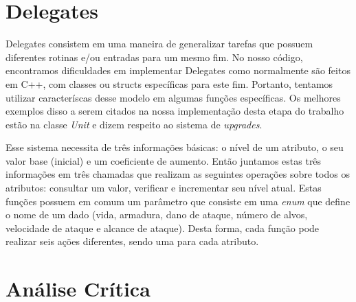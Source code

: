 \documentclass[rel_mlp]{iiufrgs}
\begin{document}
 	
 \section{Delegates}
 
 	Delegates consistem em uma maneira de generalizar tarefas que possuem diferentes rotinas e/ou entradas para um mesmo fim. No nosso código, encontramos dificuldades em implementar Delegates como normalmente são feitos em C++, com classes ou structs específicas para este fim. Portanto, tentamos utilizar caracteríscas desse modelo em algumas funções específicas. Os melhores exemplos disso a serem citados na nossa implementação desta etapa do trabalho estão na classe \textit{Unit} e dizem respeito ao sistema de \textit{upgrades}. 
 	
 	Esse sistema necessita de três informações básicas: o nível de um atributo, o seu valor base (inicial) e um coeficiente de aumento. Então juntamos estas três informações em três chamadas que realizam as seguintes operações sobre todos os atributos: consultar um valor, verificar e incrementar seu nível atual. Estas funções possuem em comum um parâmetro que consiste em uma \textit{enum} que define o nome de um dado (vida, armadura, dano de ataque, número de alvos, velocidade de ataque e alcance de ataque). Desta forma, cada função pode realizar seis ações diferentes, sendo uma para cada atributo.
 
 
 \section{Análise Crítica}
 
\end{document}
